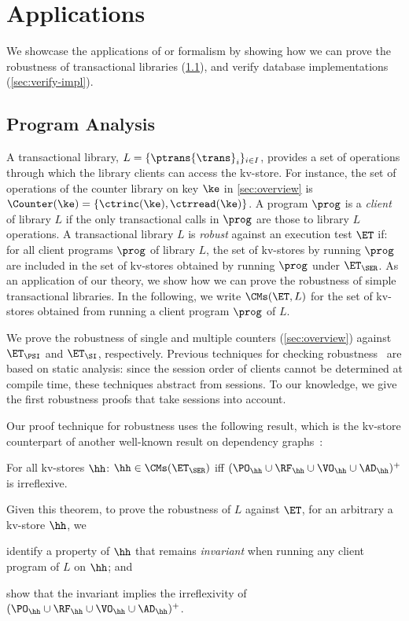 \section{Applications}
\label{sec:applications}

We showcase the applications of or formalism by showing how we can prove the robustness of transactional libraries (\cref{sec:program-analysis}), and verify database implementations (\cref{sec:verify-impl}).

\subsection{Program Analysis}
\label{sec:program-analysis}
A transactional library, $L = \{\ptrans{\trans}_{i}\}_{i \in I}$, 
provides a set of operations through which the library clients can access the kv-store. 
For instance, the set of operations of the counter library on key $\ke$ in \cref{sec:overview} is $\Counter(\ke) = \{\ctrinc(\ke), \ctrread(\ke)\}$.
A program $\prog$ is a \emph{client} of library $L$ if the only transactional calls in $\prog$ are those to library $L$ operations.  
A transactional library $L$ is \emph{robust} against an execution test $\ET$ if: 
for all client programs $\prog$ of library $L$, the set of kv-stores by running $\prog$ are included in the set of kv-stores obtained by running $\prog$ under $\ET_{\SER}$.
As an application of our theory, we show how we can prove the robustness of simple transactional libraries. 
In the following, we write $\CMs(\ET, L)$ for the set of kv-stores obtained from running a client program $\prog$ of $L$. 

We prove the robustness of single and multiple counters (\cref{sec:overview}) against $\ET_{\PSI}$ and $\ET_{\SI}$, respectively.
Previous techniques for checking robustness~\cite{giovanni_concur16,SIanalysis,laws,sureshConcur} 
are based on static analysis: since the session order of clients cannot be determined at compile 
time, these techniques abstract from sessions. 
To our knowledge, we give the first robustness proofs that take sessions into account.

Our proof technique for robustness uses the following result, which is the kv-store counterpart of another well-known result on dependency graphs~\cite{adya}:
\begin{theorem}
\label{thm:serialisable_nocycle}
For all kv-stores $\hh$: $\hh \in \CMs(\ET_{\SER})$ iff $(\PO_{\hh} \cup \RF_{\hh} 
\cup \VO_{\hh} \cup \AD_{\hh})^{+}$ is irreflexive.
\end{theorem}
Given this theorem, to prove the robustness of $L$ against $\ET$, 
for an arbitrary a kv-store $\hh$, we 
\begin{enumerate*}
	\item identify a property of $\hh$ that remains \emph{invariant} when running any client program of $L$ on $\hh$; and 
	\item show that the invariant implies the irreflexivity of $(\PO_{\hh} \cup \RF_{\hh} \cup \VO_{\hh} \cup \AD_{\hh})^{+}$.
\end{enumerate*}


